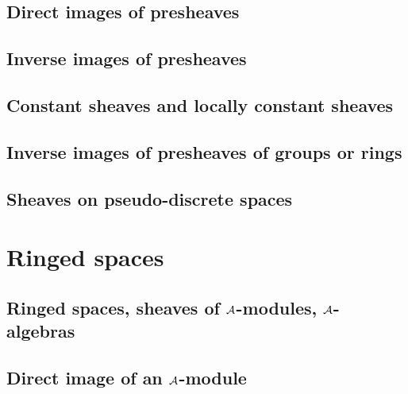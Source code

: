         \subsection{Direct images of presheaves}
        \label{0-prelim-3.4}
        

        \subsection{Inverse images of presheaves}
        \label{0-prelim-3.5}
        

        \subsection{Constant sheaves and locally constant sheaves}
        \label{0-prelim-3.6}
        

        \subsection{Inverse images of presheaves of groups or rings}
        \label{0-prelim-3.7}
        

        \subsection{Sheaves on pseudo-discrete spaces}
        \label{0-prelim-3.8}
        

    \section{Ringed spaces}
    \label{0-prelim-4}

        \subsection{Ringed spaces, sheaves of $\mathcal{A}$-modules, $\mathcal{A}$-algebras}
        \label{0-prelim-4.1}
        

        \subsection{Direct image of an $\mathcal{A}$-module}
        \label{0-prelim-4.2}
        

